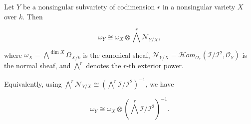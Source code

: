 Let $Y$ be a nonsingular subvariety of codimension $r$ in a nonsingular variety $X$ over $k$. Then

$$\omega_Y \cong \omega_X \otimes \bigwedge^r \mathcal{N}_{Y/X},$$

where $\omega_X = \bigwedge^{\dim X} \Omega_{X/k}$ is the canonical sheaf, $\mathcal{N}_{Y/X} = \mathcal{H}om_{\mathcal{O}_Y}(\mathcal{I}/\mathcal{I}^2, \mathcal{O}_Y)$ is the normal sheaf, and $\bigwedge^r$ denotes the $r$-th exterior power.

Equivalently, using $\bigwedge^r \mathcal{N}_{Y/X} \cong (\bigwedge^r \mathcal{I}/\mathcal{I}^2)^{-1}$, we have

$$\omega_Y \cong \omega_X \otimes (\bigwedge^r \mathcal{I}/\mathcal{I}^2)^{-1}.$$
